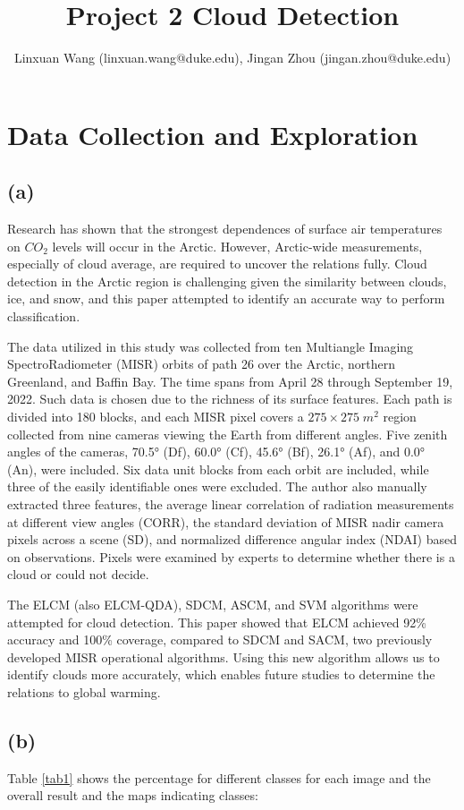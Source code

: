\documentclass[11pt]{article}
\title{Project 2 Cloud Detection}
\author{Linxuan Wang (linxuan.wang@duke.edu), Jingan Zhou (jingan.zhou@duke.edu)}
\theoremstyle{definition}
\begin{document}
\maketitle

\section{Data Collection and Exploration}
\subsection*{(a)}
Research has shown that the strongest dependences of surface air temperatures on \(CO_2\) levels will occur in the Arctic. However, Arctic-wide measurements, especially of cloud average, are required to uncover the relations fully. Cloud detection in the Arctic region is challenging given the similarity between clouds, ice, and snow, and this paper attempted to identify an accurate way to perform classification.

The data utilized in this study was collected from ten Multiangle Imaging SpectroRadiometer (MISR) orbits of path 26 over the Arctic, northern Greenland, and Baffin Bay. The time spans from April 28 through September 19, 2022. Such data is chosen due to the richness of its surface features. Each path is divided into 180 blocks, and each MISR pixel covers a \( 275 \times 275 \; m^2 \) region collected from nine cameras viewing the Earth from different angles. Five zenith angles of the cameras, 70.5° (Df), 60.0° (Cf), 45.6° (Bf), 26.1° (Af), and 0.0° (An), were included. Six data unit blocks from each orbit are included, while three of the easily identifiable ones were excluded. The author also manually extracted three features, the average linear correlation of radiation measurements at different view angles (CORR), the standard deviation of MISR nadir camera pixels across a scene (SD), and normalized difference angular index (NDAI) based on observations. Pixels were examined by experts to determine whether there is a cloud or could not decide.

The ELCM (also ELCM-QDA), SDCM, ASCM, and SVM algorithms were attempted for cloud detection. This paper showed that ELCM achieved 92\% accuracy and 100\% coverage, compared to SDCM and SACM, two previously developed MISR operational algorithms. Using this new algorithm allows us to identify clouds more accurately, which enables future studies to determine the relations to global warming.

\subsection*{(b)}
Table \ref{tab1} shows the percentage for different classes for each image and the overall result and the maps indicating classes:
\end{document}
